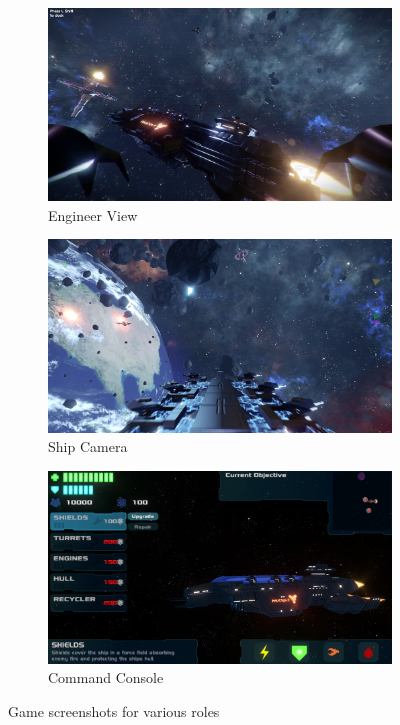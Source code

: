 \documentclass[a4paper,11pt]{article}
\begin{document}
\begin{figure}[ht]
	\centering
    \begin{subfigure}[b]{0.3\textwidth}
    	\centering
    	\includegraphics[width=\textwidth]{eng}
    	\caption{Engineer View}
    \end{subfigure}
    \begin{subfigure}[b]{0.3\textwidth}
    	\centering
    	\includegraphics[width=\textwidth]{cam}
    	\caption{Ship Camera}
    \end{subfigure}
        \begin{subfigure}[b]{0.3\textwidth}
    	\centering
    	\includegraphics[width=\textwidth]{command}
    	\caption{Command Console}
    \end{subfigure}
    \caption{Game screenshots for various roles}
    \label{fig:roles_screenshot}
\end{figure}
\end{document}
